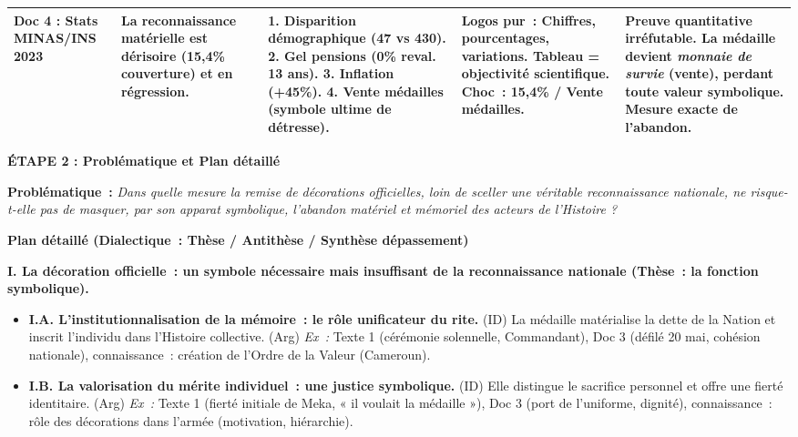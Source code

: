 \documentclass[11pt]{article}
\begin{document}
\begin{exoresolu}
\begin{center}
\begin{tabularx}{\linewidth}{|l|X|X|X|X|}
\textbf{Doc 4 : Stats MINAS/INS 2023} & La reconnaissance matérielle est dérisoire (15,4\% couverture) et en régression. & 1. Disparition démographique (47 vs 430). 2. Gel pensions (0\% reval. 13 ans). 3. Inflation (+45\%). 4. Vente médailles (symbole ultime de détresse). & \textbf{Logos pur}~: Chiffres, pourcentages, variations. \textbf{Tableau} = objectivité scientifique. \textbf{Choc}~: 15,4\% / Vente médailles. & \textbf{Preuve quantitative} irréfutable. La médaille devient \emph{monnaie de survie} (vente), perdant toute valeur symbolique. Mesure exacte de l'abandon. \\ \hline
\end{tabularx}
\end{center}

\textbf{ÉTAPE 2 : Problématique et Plan détaillé}

\noindent \textbf{Problématique~:} \og \emph{Dans quelle mesure la remise de décorations officielles, loin de sceller une véritable reconnaissance nationale, ne risque-t-elle pas de masquer, par son apparat symbolique, l'abandon matériel et mémoriel des acteurs de l'Histoire ?} \fg

\noindent \textbf{Plan détaillé (Dialectique~: Thèse / Antithèse / Synthèse dépassement)}

\textbf{I. La décoration officielle~: un symbole nécessaire mais insuffisant de la reconnaissance nationale (Thèse~: la fonction symbolique).}
\begin{itemize}
    \item \textbf{I.A. L'institutionnalisation de la mémoire~: le rôle unificateur du rite.} (ID) La médaille matérialise la dette de la Nation et inscrit l'individu dans l'Histoire collective. (Arg) \emph{Ex~:} Texte 1 (cérémonie solennelle, Commandant), Doc 3 (défilé 20 mai, cohésion nationale), connaissance~: création de l'Ordre de la Valeur (Cameroun).
    \item \textbf{I.B. La valorisation du mérite individuel~: une justice symbolique.} (ID) Elle distingue le sacrifice personnel et offre une fierté identitaire. (Arg) \emph{Ex~:} Texte 1 (fierté initiale de Meka, « il voulait la médaille »), Doc 3 (port de l'uniforme, dignité), connaissance~: rôle des décorations dans l'armée (motivation, hiérarchie).
\end{itemize}


\end{exoresolu}
\end{document}

